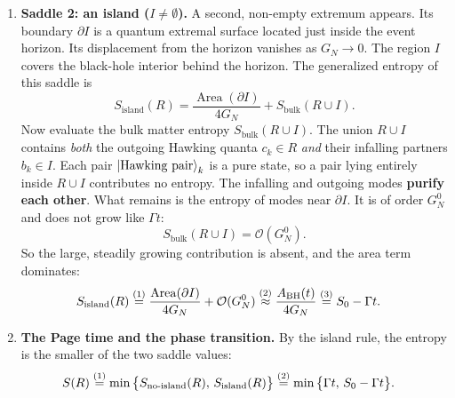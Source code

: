 \begin{keyresult}
\begin{enumerate}[leftmargin=*]
\item \textbf{Saddle 2: an island ($I \ne \emptyset$).}
A second, non-empty extremum appears. Its boundary $\partial I$ is a quantum extremal surface located just
inside the event horizon. Its displacement from the horizon vanishes as $G_N\to0$. The region $I$ covers the
black-hole interior behind the horizon. The generalized entropy of this saddle is
\[
S_{\text{island}}(R) = \frac{\operatorname{Area}(\partial I)}{4G_N} + S_{\text{bulk}}(R \cup I) .
\]
Now evaluate the bulk matter entropy $S_{\text{bulk}}(R \cup I)$. The union $R \cup I$ contains \emph{both} the
outgoing Hawking quanta $c_k \in R$ \emph{and} their infalling partners $b_k \in I$. Each pair
$\ket{\text{Hawking pair}}_k$ is a pure state, so a pair lying entirely inside $R\cup I$ contributes no entropy.
The infalling and outgoing modes \textbf{purify each other}. What remains is the entropy of modes near
$\partial I$. It is of order $G_N^0$ and does not grow like $\Gamma t$:
\[
S_{\text{bulk}}(R \cup I) = \mathcal{O}(G_N^0) .
\]
So the large, steadily growing contribution is absent, and the area term dominates:
\begin{align}
S_{\text{island}}(R) &\overset{(1)}{=} \frac{\operatorname{Area}(\partial I)}{4G_N} + \mathcal{O}(G_N^0)
\overset{(2)}{\approx} \frac{A_{\text{BH}}(t)}{4G_N} \overset{(3)}{=} S_0 - \Gamma t . \notag
\end{align}
\quad
{}\quad
{}

\item \textbf{The Page time and the phase transition.}
By the island rule, the entropy is the smaller of the two saddle values:
\begin{align}
S(R) &\overset{(1)}{=} \min\big\{ S_{\text{no-island}}(R), \, S_{\text{island}}(R) \big\}
\overset{(2)}{=} \min\big\{ \Gamma t, \, S_0 - \Gamma t \big\} . \notag
\end{align}
\quad
{}


\end{enumerate}
\end{keyresult}
